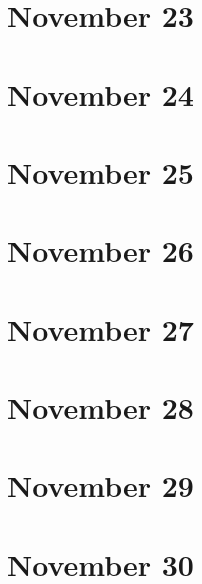 \section{November 23}

\section{November 24}

\section{November 25}

\section{November 26}

\section{November 27}

\section{November 28}

\section{November 29}

\section{November 30}

